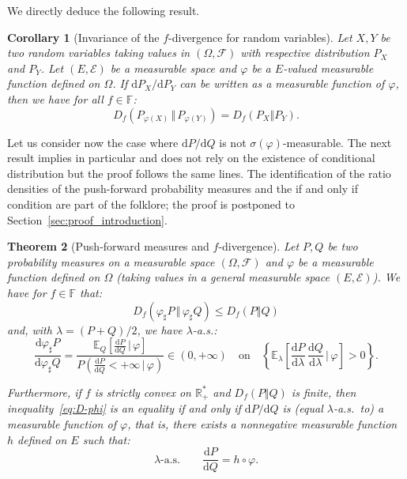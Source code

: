 \documentclass[12pt]{article}
\newcommand{\ce}{{\mathcal E}}
\newcommand{\cf}{{\mathcal F}}
\newcommand{\E}{{\mathbb E}}
\newcommand{\F}{{\mathbb F}}
\newcommand{\R}{{\mathbb R}}
\newcommand{\rd}{\mathrm{d}}
\theoremstyle{plain}
\newtheorem{theo}{Theorem}
\newtheorem{cor}[theo]{Corollary}
\theoremstyle{remark}
\begin{document}
We  directly deduce  the following result.

\begin{cor}[Invariance of the $f$-divergence for random variables]
  \label{cor:inv-gen-XY}
  Let $X,Y$ be  two random variables taking values in $(\Omega, \cf)$
     with respective distribution $P_X$ and $P_Y$. Let $(E, \ce)$ be a
     measurable space and $\varphi$ be a $E$-valued measurable function
     defined on $\Omega$. If $\rd P_X / \rd P_Y$ can be written as a
     measurable function of $\varphi$, then we have for all $f\in \F$:
     \[
        D_f( P_{\varphi(X)} \, \Vert \,  P_{\varphi(Y)})= D_f(P_X \Vert P_Y ).
    \]
\end{cor}



Let us consider now  the  case   where  $\rd   P  /   \rd  Q$   is  not
$\sigma(\varphi)$-measurable.  The  next  result implies  in  particular
\citet[Theorem 7.4]{polyanskiy2025information} and does not rely on the
existence of  conditional distribution  but the  proof follows  the same
lines.  The  identification of the  ratio densities of the  push-forward
probability measures and the if and only if condition are part of the folklore; the proof
is postponed to Section~\ref{sec:proof_introduction}.




\begin{theo}[Push-forward measures and  $f$-divergence]
  \label{thm:increase-Df}
  Let $P,Q$ be  two probability measures  on a  measurable space
  $(\Omega,  \cf)$ and  $\varphi$ be  a measurable  function defined  on
  $\Omega$ (taking values in a  general measurable space $(E, \ce)$). We
  have for $f\in \F$ that:
\begin{equation}
   \label{eq:D-phi}
   D_f(\varphi_\sharp P \, \Vert \, \varphi_ \sharp Q) \leq
   D_f(P    \Vert Q)
    \end{equation}
    and, with $\lambda=(P+Q)/2$, we have $\lambda$-a.s.:
 \begin{equation}
   \label{eq:contrib-pq>0}
   \frac{\rd \varphi_\sharp P}{\rd \varphi _\sharp Q}=
   \frac{\E_Q\left[\frac{\rd P}{\rd Q} \, \big |\, \varphi\right]}
   {P\left(\frac{\rd P}{\rd Q}<+\infty  \, \big |\, \varphi\right)}
   \in (0, +\infty )
   \quad\text{on}\quad
        \left\{\E_\lambda\left[\frac{\rd P}{\rd \lambda}\, \frac{\rd
              Q}{\rd \lambda}\, \big |\, \varphi \right]>0
      \right\}.
    \end{equation}

    Furthermore,   if   $f$   is   strictly   convex   on   $\R_+^*$   and
    $ D_f(P \Vert Q)$ is finite, then inequality~\eqref{eq:D-phi} is
    an equality if and only if $\rd P/\rd Q$ is (equal $\lambda$-a.s.\
    to) a measurable function of
    $\varphi$, that  is, there exists a  nonnegative measurable function
    $h$ defined on $E$ such that:
    \[
    \text{$\lambda$-a.s.}\quad \quad  \frac{\rd P}{\rd Q}= h\circ \varphi.
    \]
\end{theo}
\end{document}
